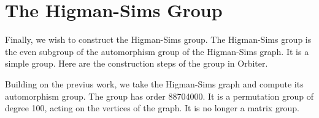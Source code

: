 \documentclass[10pt]{article}
\begin{document}
\bigskip



\section{The Higman-Sims Group}


Finally, we wish to construct the Higman-Sims group. 
The Higman-Sims group is the even subgroup of the automorphism group of the Higman-Sims graph. 
It is a simple group. 
Here are the construction steps of the group in Orbiter.

\bigskip

Building on the previus work, we take the Higman-Sims graph 
and compute its automorphism group. The group has order 88704000.
It is a permutation group of degree 100, acting on the vertices of the graph. 
It is no longer a matrix group.







\end{document}

